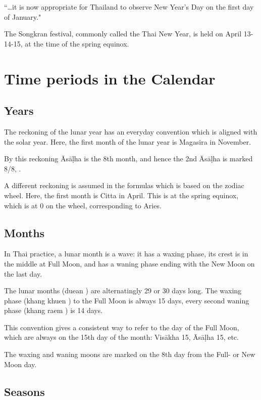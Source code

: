 \documentclass[11pt,oneside]{memoir-article}
\begin{document}
``\ldots{}it is now appropriate for Thailand to observe New Year's Day on the first
day of January."\autocite{wp-thai-new-year-day}

The Songkran festival, commonly called the Thai New Year, is held on April
13-14-15, at the time of the spring equinox.

\section{Time periods in the Calendar}
\label{sec-3-2}
\label{years-seasons}

\subsection{Years}
\label{sec-3-2-1}

The reckoning of the lunar year has an everyday convention which is aligned with
the solar year. Here, the first month of the lunar year is Magasira in November.

By this reckoning Āsāḷha is the 8th month, and hence the 2nd Āsāḷha is marked
8/8, .

A different reckoning is assumed in the formulas which is based on the zodiac
wheel. Here, the first month is Citta in April. This is at the spring equinox,
which is at 0\degrees{} on the wheel, corresponding to Aries.

\subsection{Months}
\label{sec-3-2-2}

In Thai practice, a lunar month is a wave: it has a waxing phase, its crest is
in the middle at Full Moon, and has a waning phase ending with the New Moon on
the last day.

The lunar months (duean ) are alternatingly 29 or 30 days long. The
waxing phase (khang khuen ) to the Full Moon is always 15 days,
every second waning phase (khang raem ) is 14 days.\autocite{wp-thai-lunar-calendar}

This convention gives a consistent way to refer to the day of the Full Moon,
which are always on the 15th day of the month: Visākha 15, Āsāḷha 15, etc.

The waxing and waning moons are marked on the 8th day from the Full- or New Moon
day.

\clearpage

\subsection{Seasons}
\label{sec-3-2-3}
\end{document}
